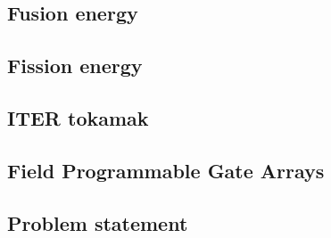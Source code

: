 \subsection{Fusion energy}


\subsection{Fission energy}


\subsection{ITER tokamak}


\subsection{Field Programmable Gate Arrays}


\subsection{Problem statement}

